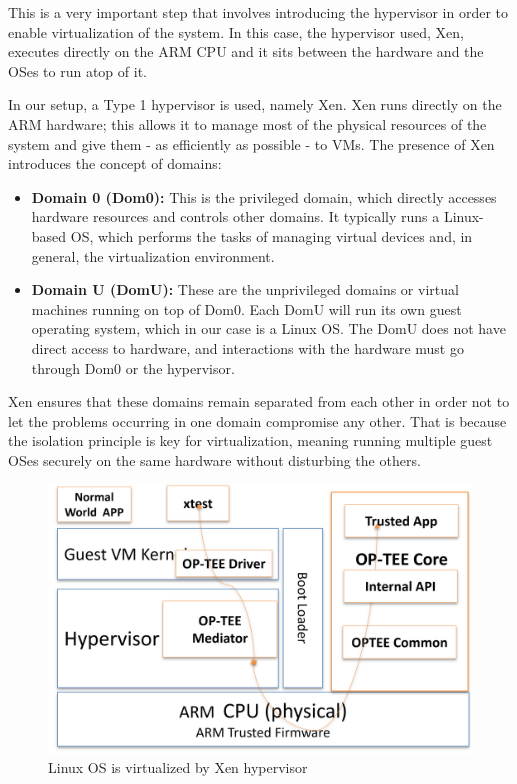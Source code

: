 \documentclass[acmtog]{acmart}
\begin{document}
This is a very important step that involves introducing the hypervisor in order to enable virtualization of the system. In this case, the hypervisor used, Xen, executes directly on the ARM CPU and it sits between the hardware and the OSes to run atop of it.

In our setup, a Type 1 hypervisor is used, namely Xen. Xen runs directly on the ARM hardware; this allows it to manage most of the physical resources of the system and give them - as efficiently as possible - to VMs. The presence of Xen introduces the concept of domains:

\begin{itemize}
    \item \textbf{Domain 0 (Dom0):} This is the privileged domain, which directly accesses hardware resources and controls other domains. It typically runs a Linux-based OS, which performs the tasks of managing virtual devices and, in general, the virtualization environment.
    \item \textbf{Domain U (DomU):} These are the unprivileged domains or virtual machines running on top of Dom0. Each DomU will run its own guest operating system, which in our case is a Linux OS. The DomU does not have direct access to hardware, and interactions with the hardware must go through Dom0 or the hypervisor.
\end{itemize}

Xen ensures that these domains remain separated from each other in order not to let the problems occurring in one domain compromise any other. That is because the isolation principle is key for virtualization, meaning running multiple guest OSes securely on the same hardware without disturbing the others.



\begin{figure}[ht]
  \centering
  \includegraphics[width=\columnwidth]{images/2.png}
  \caption{Linux OS is virtualized by Xen hypervisor}
  \label{fig:image_label}
\end{figure}
\end{document}
